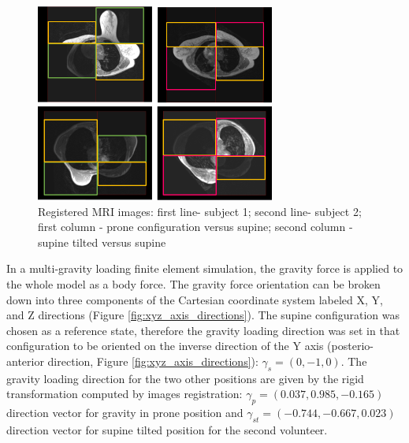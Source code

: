 \begin{figure}[!h]
\centering
\includegraphics[width=0.7\textwidth,keepaspectratio]{figures/patientDataRegistered.png} 
\caption{Registered MRI images: first line- subject 1; second line- subject 2; first column - prone configuration versus supine; second column - supine tilted versus supine }\label{fig:patientdataregistered}
\end{figure}

In a multi-gravity loading finite element simulation, the gravity force is applied to the whole model as a body force. The gravity force orientation can be broken down into three components of the Cartesian coordinate system labeled X, Y, and Z directions (Figure \ref{fig:xyz_axis_directions}). The supine configuration was chosen as a reference state, therefore the gravity loading direction was set in that configuration to be oriented on the inverse direction of the Y axis (posterio-anterior direction, Figure \ref{fig:xyz_axis_directions}): $\gamma_s = (0,-1,0)$.   The gravity loading direction for the two other positions are given by the rigid transformation computed by images registration: $\gamma_p = (0.037, 0.985, -0.165)$ direction vector for gravity in prone position and $\gamma_{st} = (-0.744 , -0.667, 0.023)$ direction vector for supine tilted position for the second volunteer.

